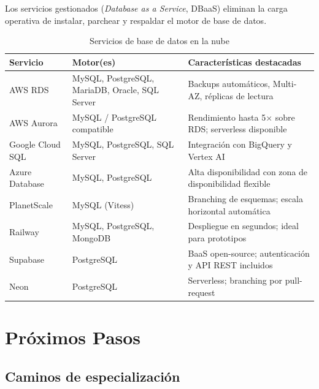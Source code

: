 Los servicios gestionados (\textit{Database as a Service}, DBaaS) eliminan
la carga operativa de instalar, parchear y respaldar el motor de base de
datos.

\begin{table}[H]
  \centering
  \caption{Servicios de base de datos en la nube}
  \renewcommand{\arraystretch}{1.3}
  \begin{tabularx}{\textwidth}{l l X}
    \toprule
    \textbf{Servicio}     & \textbf{Motor(es)}           & \textbf{Características destacadas}                     \\
    \midrule
    AWS RDS               & MySQL, PostgreSQL, MariaDB, Oracle, SQL Server
                                                          & Backups automáticos, Multi-AZ, réplicas de lectura      \\
    AWS Aurora            & MySQL / PostgreSQL compatible& Rendimiento hasta 5$\times$ sobre RDS; serverless disponible \\
    Google Cloud SQL      & MySQL, PostgreSQL, SQL Server& Integración con BigQuery y Vertex AI                    \\
    Azure Database        & MySQL, PostgreSQL            & Alta disponibilidad con zona de disponibilidad flexible  \\
    PlanetScale           & MySQL (Vitess)               & Branching de esquemas; escala horizontal automática      \\
    Railway               & MySQL, PostgreSQL, MongoDB   & Despliegue en segundos; ideal para prototipos            \\
    Supabase              & PostgreSQL                   & BaaS open-source; autenticación y API REST incluidos     \\
    Neon                  & PostgreSQL                   & Serverless; branching por pull-request                   \\
    \bottomrule
  \end{tabularx}
\end{table}

\section{Próximos Pasos}

\subsection*{Caminos de especialización}

